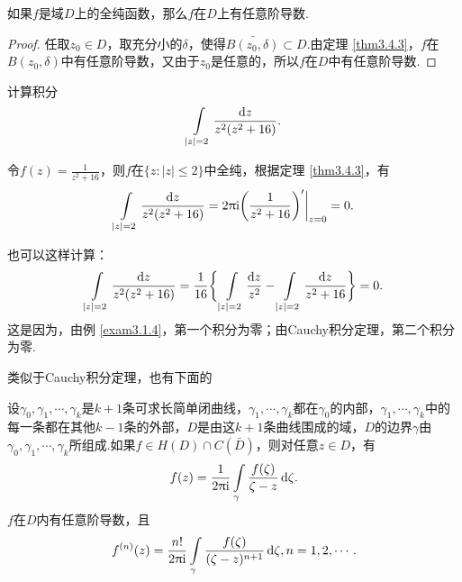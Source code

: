 \begin{theorem}\label{thm3.4.4}
  如果$f$是域$D$上的全纯函数，那么$f$在$D$上有任意阶导数.
\end{theorem}
\begin{proof}
  任取$z_0\in D$，取充分小的$\delta$，使得$\bar{B(z_0,\delta)}\subset D$.由定理 \ref{thm3.4.3}，$f$在$B(z_0,\delta)$中有任意阶导数，又由于$z_0$是任意的，所以$f$在$D$中有任意阶导数.
\end{proof}

\begin{example}\label{exam3.4.5}
  计算积分
  \[
    \int\limits_{|z|=2} \frac{\mathop{}\!\mathrm dz}{z^2(z^2+16)}.
  \]
\end{example}
\begin{solution}
  令$f(z)=\frac1{z^2+16}$，则$f$在$\{z:|z|\le2\}$中全纯，根据定理 \ref{thm3.4.3}，有
  \[
    \int\limits_{|z|=2}\frac{\mathop{}\!\mathrm dz}{z^2(z^2+16)}=2\uppi\mathrm i
    \bigg(\frac1{z^2+16}\bigg)'\bigg|_{z=0}=0.
  \]

  也可以这样计算：
  \[
    \int\limits_{|z|=2}\frac{\mathop{}\!\mathrm dz}{z^2(z^2+16)} = \frac1{16}
    \bigg\{\int\limits_{|z|=2}\frac{\mathop{}\!\mathrm dz}{z^2}-\int\limits_{|z|=2}\frac{\mathop{}\!\mathrm dz}{z^2+16}\bigg\} = 0.
  \]
  这是因为，由例 \ref{exam3.1.4}，第一个积分为零；由Cauchy积分定理，第二个积分为零.
\end{solution}

类似于Cauchy积分定理，也有下面的
\begin{theorem}\label{thm3.4.6}
  设$\gamma_0,\gamma_1,\cdots,\gamma_k$是$k+1$条可求长简单闭曲线，$\gamma_1,\cdots,\gamma_k$都在$\gamma_0$的内部，$\gamma_1,\cdots,\gamma_k$中的每一条都在其他$k-1$条的外部，$D$是由这$k+1$条曲线围成的域，$D$的边界$\gamma$由$\gamma_0,\gamma_1,\cdots,\gamma_k$所组成.如果$f\in H(D)\cap C(\bar D)$，则对任意$z\in D$，有
  \[f(z)=\frac1{2\uppi\mathrm i}\int\limits_{\gamma}\frac{f(\zeta)}{\zeta-z}\mathop{}\!\mathrm{d} \zeta.\]
  $f$在$D$内有任意阶导数，且
  \[
    f^{(n)}(z) = \frac{n!}{2\uppi\mathrm i}\int\limits_\gamma\frac{f(\zeta)}{(\zeta-z)^{n+1}}\mathop{}\!\mathrm{d} \zeta,n=1,2,\cdots.
  \]
\end{theorem}

